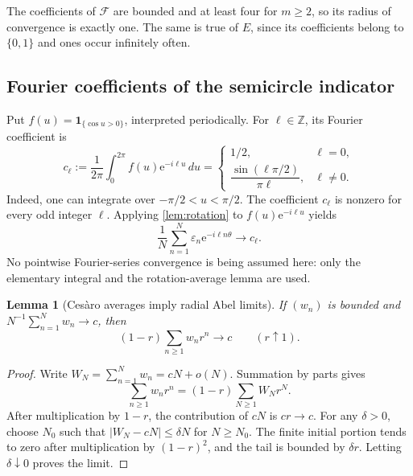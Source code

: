 \documentclass[11pt]{article}
\newtheorem{lemma}[theorem]{Lemma}
\theoremstyle{definition}\newtheorem{definition}[theorem]{Definition}
\theoremstyle{remark}\newtheorem{remark}[theorem]{Remark}
\newcommand{\Z}{\mathbb Z}\newcommand{\Q}{\mathbb Q}\newcommand{\C}{\mathbb C}
\newcommand{\eps}{\varepsilon}
\newcommand{\ind}{\mathbf 1}
\newcommand{\F}{\mathcal F}
\newcommand{\ee}{\mathrm e}
\begin{document}
The coefficients of $\F$ are bounded and at least four for $m\geq2$, so its radius of convergence is exactly one. The same is true of $E$, since its coefficients belong to $\{0,1\}$ and ones occur infinitely often.

\subsection{Fourier coefficients of the semicircle indicator}

Put $f(u)=\ind_{\{\cos u>0\}}$, interpreted periodically. For $\ell\in\Z$, its Fourier coefficient is
\begin{equation}\label{eq:fourier}
 c_\ell:=\frac1{2\pi}\int_0^{2\pi}f(u)\ee^{-i\ell u}\,du
 =\begin{cases}
 1/2,&\ell=0,\\[2pt]
 \dfrac{\sin(\ell\pi/2)}{\pi\ell},&\ell\ne0.
 \end{cases}
\end{equation}
Indeed, one can integrate over $-\pi/2<u<\pi/2$. The coefficient $c_\ell$ is nonzero for every odd integer $\ell$. Applying \cref{lem:rotation} to $f(u)\ee^{-i\ell u}$ yields
\begin{equation}\label{eq:weightedmean}
 \frac1N\sum_{n=1}^N\eps_n\ee^{-i\ell n\theta}\longrightarrow c_\ell.
\end{equation}
No pointwise Fourier-series convergence is being assumed here: only the elementary integral and the rotation-average lemma are used.

\begin{lemma}[Ces\`aro averages imply radial Abel limits]\label{lem:abel}
If $(w_n)$ is bounded and $N^{-1}\sum_{n=1}^Nw_n\to c$, then
\begin{equation}\label{eq:abellimit}
 (1-r)\sum_{n\geq1}w_nr^n\longrightarrow c\qquad(r\uparrow1).
\end{equation}
\end{lemma}
\begin{proof}
Write $W_N=\sum_{n=1}^Nw_n=cN+o(N)$. Summation by parts gives
\[
 \sum_{n\geq1}w_nr^n=(1-r)\sum_{N\geq1}W_Nr^N.
\]
After multiplication by $1-r$, the contribution of $cN$ is $cr\to c$. For any $\delta>0$, choose $N_0$ such that $|W_N-cN|\leq\delta N$ for $N\geq N_0$. The finite initial portion tends to zero after multiplication by $(1-r)^2$, and the tail is bounded by $\delta r$. Letting $\delta\downarrow0$ proves the limit.
\end{proof}
\end{document}
